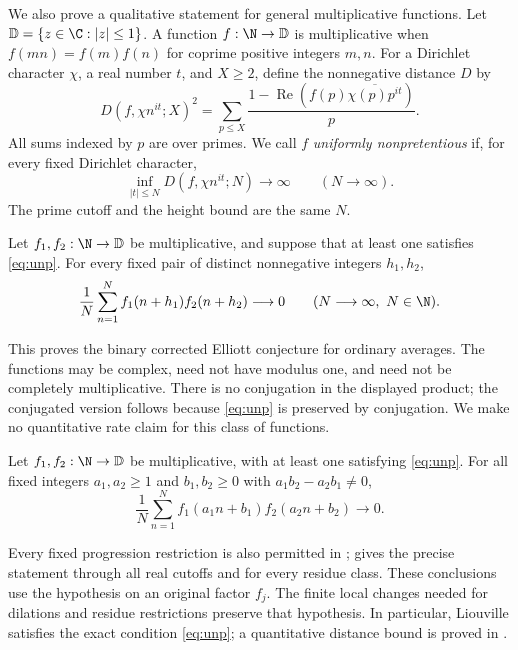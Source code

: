 We also prove a qualitative statement for general multiplicative
functions. Let \(\mathbb D=\{z\in\C:|z|\le1\}\). A function
\(f:\N\to\mathbb D\) is multiplicative when
\(f(mn)=f(m)f(n)\) for coprime positive integers \(m,n\).
For a Dirichlet character \(\chi\), a real number \(t\), and \(X\ge2\),
define the nonnegative distance \(D\) by
\begin{equation}\label{eq:distance}
 D(f,\chi n^{it};X)^2
 =\sum_{p\le X}\frac{1-\operatorname{Re}
       (f(p)\overline{\chi(p)p^{it}})}p.
\end{equation}
All sums indexed by \(p\) are over primes. We call \(f\)
\emph{uniformly nonpretentious} if, for every fixed Dirichlet character,
\begin{equation}\label{eq:unp}
 \inf_{|t|\le N}D(f,\chi n^{it};N)\longrightarrow\infty
 \qquad(N\longrightarrow\infty).
\end{equation}
The prime cutoff and the height bound are the same \(N\).

\begin{theorem}\label{thm:elliott}
Let \(f_1,f_2:\N\to\mathbb D\) be multiplicative, and suppose that
at least one satisfies \eqref{eq:unp}. For every fixed pair of distinct
nonnegative integers \(h_1,h_2\),
\[
 \frac1N\sum_{n=1}^N f_1(n+h_1)f_2(n+h_2)\longrightarrow0
 \qquad(N\longrightarrow\infty,\ N\in\N).
\]
\end{theorem}

This proves the binary corrected Elliott conjecture for ordinary
averages. The functions may be complex, need not have modulus one,
and need not be completely multiplicative. There is no conjugation
in the displayed product; the conjugated version follows because
\eqref{eq:unp} is preserved by conjugation. We make no quantitative
rate claim for this class of functions.

\begin{corollary}\label{cor:affine}
Let \(f_1,f_2:\N\to\mathbb D\) be multiplicative, with at least one
satisfying \eqref{eq:unp}. For all fixed integers \(a_1,a_2\ge1\) and
\(b_1,b_2\ge0\) with \(a_1b_2-a_2b_1\ne0\),
\[
 \frac1N\sum_{n=1}^N f_1(a_1n+b_1)f_2(a_2n+b_2)
 \longrightarrow0.
\]
\end{corollary}

Every fixed progression restriction is also permitted in
;  gives the precise
statement through all real cutoffs and for every residue class.
These conclusions use the hypothesis on an original factor \(f_j\).
The finite local changes needed for dilations and residue restrictions
preserve that hypothesis. In particular, Liouville satisfies the exact
condition \eqref{eq:unp}; a quantitative distance bound is proved in
.

